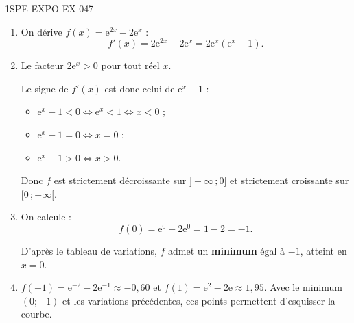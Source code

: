 \begin{corrige}{1SPE-EXPO-EX-047}
\begin{enumerate}
\item On dérive $f(x) = \mathrm{e}^{2x} - 2\mathrm{e}^x$ :
\[f'(x) = 2\mathrm{e}^{2x} - 2\mathrm{e}^x = 2\mathrm{e}^x(\mathrm{e}^x - 1).\]

\item Le facteur $2\mathrm{e}^x > 0$ pour tout réel $x$.

Le signe de $f'(x)$ est donc celui de $\mathrm{e}^x - 1$ :
\begin{itemize}
\item $\mathrm{e}^x - 1 < 0 \iff \mathrm{e}^x < 1 \iff x < 0$ ;
\item $\mathrm{e}^x - 1 = 0 \iff x = 0$ ;
\item $\mathrm{e}^x - 1 > 0 \iff x > 0$.
\end{itemize}

Donc $f$ est strictement décroissante sur $]-\infty\,;0]$ et strictement croissante sur $[0\,;+\infty[$.

\item On calcule :
\[f(0) = \mathrm{e}^0 - 2\mathrm{e}^0 = 1 - 2 = -1.\]

D'après le tableau de variations, $f$ admet un \textbf{minimum} égal à $\boxed{-1}$, atteint en $x = 0$.

\item $f(-1)=\mathrm{e}^{-2}-2\mathrm{e}^{-1}\approx-0{,}60$ et $f(1)=\mathrm{e}^{2}-2\mathrm{e}\approx1{,}95$. Avec le minimum $(0;-1)$ et les variations précédentes, ces points permettent d'esquisser la courbe.
\end{enumerate}
\end{corrige}
